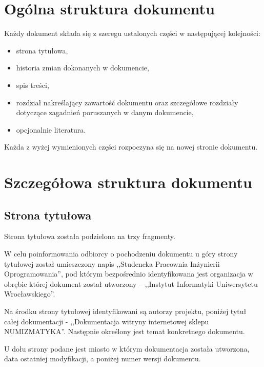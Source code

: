 \documentclass [11pt, a4paper, leqno]	{article}	%
\begin{document}
\section{Ogólna struktura dokumentu}
\noindent
Każdy dokument składa się z szeregu ustalonych części w następującej kolejności:
\begin{itemize}
	\item strona tytułowa,
	\item historia zmian dokonanych w dokumencie,
	\item spis treści,
	\item rozdział nakreślający zawartość dokumentu oraz szczegółowe rozdziały dotyczące zagadnień poruszanych w danym dokumencie,
	\item opcjonalnie literatura.
\end{itemize}

Każda z wyżej wymienionych części rozpoczyna się na nowej stronie dokumentu.

\section{Szczegółowa struktura dokumentu}
\subsection{Strona tytułowa}
\noindent
Strona tytułowa została podzielona na trzy fragmenty.

W celu poinformowania odbiorcy o pochodzeniu dokumentu u góry strony tytułowej został umieszczony napis ,,Studencka Pracownia Inżynierii Oprogramowania'', pod którym bezpośrednio identyfikowana jest organizacja w obrębie której dokument został utworzony -- ,,Instytut Informatyki Uniwersytetu Wrocławskiego''.

Na środku strony tytułowej identyfikowani są autorzy projektu, poniżej tytuł całej dokumentacji - ,,Dokumentacja witryny internetowej sklepu NUMIZMATYKA''.
Następnie określony jest temat konkretnego dokumentu. 

U dołu strony podane jest miasto w którym dokumentacja została utworzona, data ostatniej modyfikacji, a poniżej numer wersji dokumentu.
\end{document}
